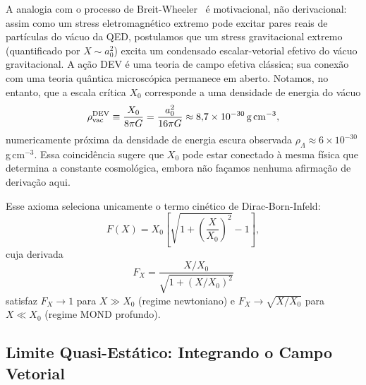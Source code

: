 \documentclass[aps,prd,twocolumn,showpacs,superscriptaddress]{revtex4-2}
\newcommand{\aO}{a_0}
\newcommand{\Xzero}{X_0}
\begin{document}
A analogia com o processo de Breit-Wheeler~\cite{BreitWheeler1934}
é motivacional, não derivacional: assim como um stress eletromagnético
extremo pode excitar pares reais de partículas do vácuo da QED,
postulamos que um stress gravitacional extremo (quantificado por
$X \sim \aO^2$) excita um condensado escalar-vetorial efetivo do
vácuo gravitacional.
A ação DEV é uma teoria de campo efetiva clássica; sua conexão com
uma teoria quântica microscópica permanece em aberto.
Notamos, no entanto, que a escala crítica $\Xzero$ corresponde a
uma densidade de energia do vácuo
\begin{equation}
  \rho_{\rm vac}^{\rm DEV}
  \equiv \frac{\Xzero}{8\pi G}
  = \frac{\aO^2}{16\pi G}
  \approx 8{,}7 \times 10^{-30}\,{\rm g\,cm^{-3}},
  \label{eq:rhovac}
\end{equation}
numericamente próxima da densidade de energia escura observada
$\rho_\Lambda \approx 6\times10^{-30}$\,g\,cm$^{-3}$.
Essa coincidência sugere que $\Xzero$ pode estar conectado à mesma
física que determina a constante cosmológica, embora não façamos
nenhuma afirmação de derivação aqui.

Esse axioma seleciona unicamente o termo cinético de Dirac-Born-Infeld:
\begin{equation}
  F(X) = \Xzero\!\left[\sqrt{1 + \left(\frac{X}{\Xzero}\right)^{\!2}} - 1\right],
  \label{eq:DBI}
\end{equation}
cuja derivada
\begin{equation}
  F_X = \frac{X/\Xzero}{\sqrt{1+(X/\Xzero)^2}}
  \label{eq:FX}
\end{equation}
satisfaz $F_X \to 1$ para $X \gg \Xzero$ (regime newtoniano) e
$F_X \to \sqrt{X/\Xzero}$ para $X \ll \Xzero$ (regime MOND profundo).

\subsection{Limite Quasi-Estático: Integrando o Campo Vetorial}
\end{document}
